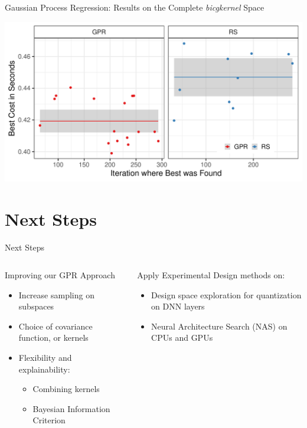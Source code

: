 \documentclass[10pt, compress, aspectratio=169, xcolor={table,usenames,dvipsnames}]{beamer}
\begin{document}
\begin{frame}[label={sec:orgf90b1b6}]{Gaussian Process Regression: Results on the Complete \emph{bicgkernel} Space}
\begin{center}
\includegraphics[width=.95\columnwidth]{../../../img/bicgkernel_gpr_results.pdf}
\end{center}
\end{frame}
\section{Next Steps}
\label{sec:org40824ac}
\begin{frame}[label={sec:orgef28d6b}]{Next Steps}
\begin{columns}
\begin{column}{0.5\columnwidth}
\begin{block}{Improving our GPR Approach}
\begin{itemize}
\item Increase sampling on subspaces
\item Choice of \alert{covariance function}, or \alert{kernels}
\item \alert{Flexibility} and \alert{explainability}:
\begin{itemize}
\item Combining kernels
\item Bayesian Information Criterion
\end{itemize}
\end{itemize}
\end{block}
\end{column}
\begin{column}{0.5\columnwidth}
\begin{block}{Apply Experimental Design methods on:}
\begin{itemize}
\item Design space exploration for \alert{quantization} on DNN layers
\item Neural Architecture Search (\alert{NAS}) on CPUs and GPUs
\end{itemize}
\end{block}
\end{column}
\end{columns}
\end{frame}
\maketitle
\end{document}
